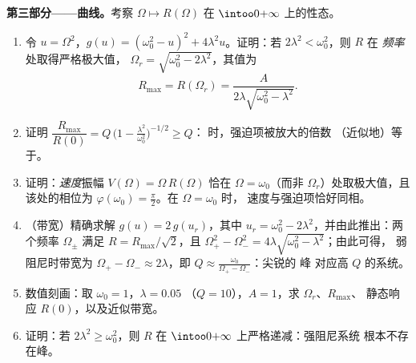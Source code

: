 \begin{problem}
\medskip
\noindent\textbf{第三部分——曲线。}考察
$\Omega \mapsto R(\Omega)$ 在 $\intoo0{+\infty}$ 上的性态。
\begin{enumerate}[resume]
  \item 令 $u = \Omega^2$，$g(u) = (\omega_0^2 - u)^2 +
        4\lambda^2 u$。证明：若 $2\lambda^2 < \omega_0^2$，则 $R$ 在
        \emph{频率}处取得严格极大值，
        $\Omega_r = \sqrt{\omega_0^2 - 2\lambda^2}$，其值为
        \[
        R_{\max} = R(\Omega_r)
        = \frac{A}{2\lambda\sqrt{\omega_0^2 - \lambda^2}} .
        \]
  \item 证明 $\dfrac{R_{\max}}{R(0)} = Q\,\bigl(1 -
        \tfrac{\lambda^2}{\omega_0^2}\bigr)^{-1/2} \geq Q$：
        时，强迫项被放大的倍数
        （近似地）等于。
  \item 证明：\emph{速度}振幅 $V(\Omega) =
        \Omega\,R(\Omega)$ 恰在 $\Omega =
        \omega_0$（而非 $\Omega_r$）处取极大值，且该处的相位为
        $\varphi(\omega_0) = \frac\pi2$。在 $\Omega = \omega_0$ 时，
        速度与强迫项恰好同相。
  \item （带宽）精确求解 $g(u) = 2\,g(u_r)$，其中 $u_r =
        \omega_0^2 - 2\lambda^2$，并由此推出：两个频率 $\Omega_\pm$ 满足
        $R = R_{\max}/\sqrt2$，且 $\Omega_+^2 - \Omega_-^2 =
        4\lambda\sqrt{\omega_0^2 - \lambda^2}$；由此可得，
        弱阻尼时带宽为 $\Omega_+ - \Omega_-
        \approx 2\lambda$，即 $Q \approx
        \frac{\omega_0}{\Omega_+ - \Omega_-}$：尖锐的
        峰
        对应高 $Q$ 的系统。
  \item 数值刻画：取 $\omega_0 = 1$，$\lambda = 0.05$
        （$Q = 10$），$A = 1$，求 $\Omega_r$、$R_{\max}$、
        静态响应 $R(0)$，以及近似带宽。
  \item 证明：若 $2\lambda^2 \geq \omega_0^2$，则 $R$ 在
        $\intoo0{+\infty}$ 上严格递减：强阻尼系统
        根本不存在峰。
\end{enumerate}


\end{problem}
